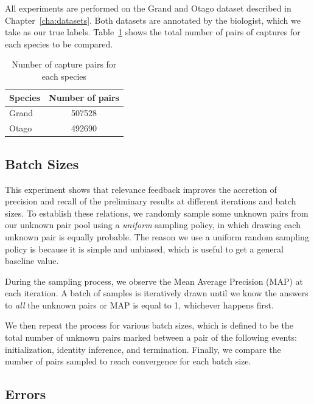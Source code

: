 All experiments are performed on the Grand and Otago dataset described in
Chapter~\ref{cha:datasets}. Both datasets are annotated by the biologist, which
we take as our true labels. Table~\ref{tab:species_npairs} shows the total number of pairs of captures for each species to be compared.

\begin{table}[t]
\captionsetup{justification=centering}
  \caption{Number of capture pairs for each species}
  \label{tab:species_npairs} %
  \centering
  \begin{tabular}{lc}
    \toprule
    Species & Number of pairs \\
    \midrule
    Grand & 507528 \\
    Otago & 492690 \\
    \bottomrule
  \end{tabular}
\end{table}

\subsection{Batch Sizes} %
\label{sub:batch_sizes}

This experiment shows that relevance feedback improves the accretion of
precision and recall of the preliminary results at different iterations and
batch sizes. To establish these relations, we randomly sample some unknown
pairs from our unknown pair pool using a \emph{uniform} sampling policy, in which
drawing each unknown pair is equally probable. The reason we use a uniform random
sampling policy is because it is simple and unbiased, which is useful to get a
general baseline value.

During the sampling process, we observe the Mean Average Precision (MAP) at
each iteration. A batch of samples is iteratively drawn until we know the
answers to \emph{all} the unknown pairs or MAP is equal to 1, whichever happens
first.

We then repeat the process for various batch sizes, which is defined to be the
total number of unknown pairs marked between a pair of the following events:
initialization, identity inference, and termination. Finally, we compare the
number of pairs sampled to reach convergence for each batch size.

\subsection{Errors} %
\label{sub:errors}


